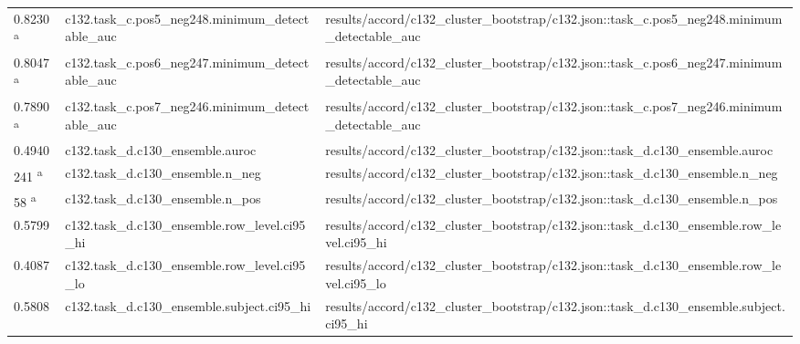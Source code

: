 \begin{longtable}{@{}p{0.7in}p{1.9in}p{2.6in}@{}}
0.8230 \textsuperscript{a} & c132.\allowbreak{}task\_c.\allowbreak{}pos5\_neg248.\allowbreak{}minimum\_detectable\_auc & results/\allowbreak{}accord/\allowbreak{}c132\_cluster\_bootstrap/\allowbreak{}c132.\allowbreak{}json::task\_c.\allowbreak{}pos5\_neg248.\allowbreak{}minimum\_detectable\_auc\\
0.8047 \textsuperscript{a} & c132.\allowbreak{}task\_c.\allowbreak{}pos6\_neg247.\allowbreak{}minimum\_detectable\_auc & results/\allowbreak{}accord/\allowbreak{}c132\_cluster\_bootstrap/\allowbreak{}c132.\allowbreak{}json::task\_c.\allowbreak{}pos6\_neg247.\allowbreak{}minimum\_detectable\_auc\\
0.7890 \textsuperscript{a} & c132.\allowbreak{}task\_c.\allowbreak{}pos7\_neg246.\allowbreak{}minimum\_detectable\_auc & results/\allowbreak{}accord/\allowbreak{}c132\_cluster\_bootstrap/\allowbreak{}c132.\allowbreak{}json::task\_c.\allowbreak{}pos7\_neg246.\allowbreak{}minimum\_detectable\_auc\\
0.4940 & c132.\allowbreak{}task\_d.\allowbreak{}c130\_ensemble.\allowbreak{}auroc & results/\allowbreak{}accord/\allowbreak{}c132\_cluster\_bootstrap/\allowbreak{}c132.\allowbreak{}json::task\_d.\allowbreak{}c130\_ensemble.\allowbreak{}auroc\\
241 \textsuperscript{a} & c132.\allowbreak{}task\_d.\allowbreak{}c130\_ensemble.\allowbreak{}n\_neg & results/\allowbreak{}accord/\allowbreak{}c132\_cluster\_bootstrap/\allowbreak{}c132.\allowbreak{}json::task\_d.\allowbreak{}c130\_ensemble.\allowbreak{}n\_neg\\
58 \textsuperscript{a} & c132.\allowbreak{}task\_d.\allowbreak{}c130\_ensemble.\allowbreak{}n\_pos & results/\allowbreak{}accord/\allowbreak{}c132\_cluster\_bootstrap/\allowbreak{}c132.\allowbreak{}json::task\_d.\allowbreak{}c130\_ensemble.\allowbreak{}n\_pos\\
0.5799 & c132.\allowbreak{}task\_d.\allowbreak{}c130\_ensemble.\allowbreak{}row\_level.\allowbreak{}ci95\_hi & results/\allowbreak{}accord/\allowbreak{}c132\_cluster\_bootstrap/\allowbreak{}c132.\allowbreak{}json::task\_d.\allowbreak{}c130\_ensemble.\allowbreak{}row\_level.\allowbreak{}ci95\_hi\\
0.4087 & c132.\allowbreak{}task\_d.\allowbreak{}c130\_ensemble.\allowbreak{}row\_level.\allowbreak{}ci95\_lo & results/\allowbreak{}accord/\allowbreak{}c132\_cluster\_bootstrap/\allowbreak{}c132.\allowbreak{}json::task\_d.\allowbreak{}c130\_ensemble.\allowbreak{}row\_level.\allowbreak{}ci95\_lo\\
0.5808 & c132.\allowbreak{}task\_d.\allowbreak{}c130\_ensemble.\allowbreak{}subject.\allowbreak{}ci95\_hi & results/\allowbreak{}accord/\allowbreak{}c132\_cluster\_bootstrap/\allowbreak{}c132.\allowbreak{}json::task\_d.\allowbreak{}c130\_ensemble.\allowbreak{}subject.\allowbreak{}ci95\_hi\\

\end{longtable}
